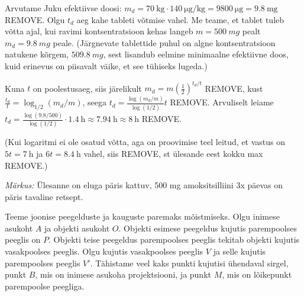 \documentclass[10pt]{article}
\newcommand{\p}[1]{REMOVE}
\begin{document}

\solu
Arvutame Juku efektiivse doosi: $m_d = \SI{70}{\kilogram} \cdot \SI{140}{\micro\gram\per\kilogram} = \SI{9800}{\micro\gram} = \SI{9,8}{\milli\gram}$ \p{2}. Olgu $t_d$ aeg kahe tableti võtmise vahel. Me teame, et tablet tuleb võtta ajal, kui ravimi kontsentratsioon kehas langeb $m = \SI{500}{mg}$ pealt $m_d = \SI{9.8}{mg}$ peale. (Järgnevate tablettide puhul on algne kontsentratsioon natukene kõrgem, $\SI{509.8}{mg}$, sest lisandub eelmine minimaalne efektiivne doos, kuid erinevus on piisavalt väike, et see tühiseks lugeda.)

Kuna $t$ on poolestusaeg, siis järelikult $m_d = m(\frac 12)^{t_d/t}$ \p{3}, kust 
$\frac{t_d}{t} = \log_{1/2}(m_d/m)$, seega $t_d = \frac{\log(m_d/m)}{\log(1/2)}t$ \p{2}. Arvuliselt leiame $t_d = \frac{\log(9.8/500)}{\log(1/2)}\cdot \SI{1.4}{\hour} \approx \SI{7.94}{\hour} \approx \SI{8}{\hour}$ \p{1}.

(Kui logaritmi ei ole osatud võtta, aga on proovimise teel leitud, et vastus on $5t = \SI{7}{\hour}$ ja $6t=\SI{8.4}{\hour}$ vahel, siis \p{-2}, st ülesande eest kokku max \p{6}.)

\textit{Märkus:} Ülesanne on eluga päris kattuv, 500 mg amoksitsilliini 3x päevas on päris tavaline retsept.
\probend
\bigskip


\solu
Teeme joonise peegelduste ja kauguste paremaks mõistmiseks. Olgu inimese asukoht $A$ ja objekti asukoht $O$. Objekti esimese peegeldus kujutis parempoolses peeglis on $P$. Objekti teise peegeldus parempoolses peeglis tekitab objekti kujutis vasakpoolses peeglis. Olgu kujutis vasakpoolses peeglis $V$ ja selle kujutis parempoolses peeglis $V'$. Tähistame veel kaks punkti kujutisi ühendaval sirgel, punkt $B$, mis on inimese asukoha projektsiooni, ja punkt $M$, mis on lõikepunkt parempoolse peegliga.
\end{document}
